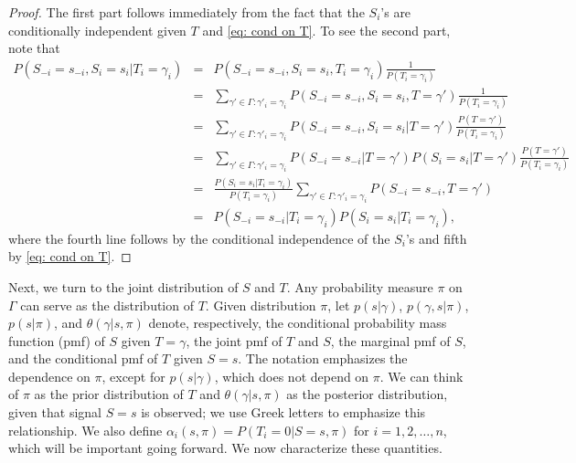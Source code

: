 \documentclass[a4paper,11pt]{article}
\begin{document}
\begin{proof}
The first part follows immediately from the fact that the $S_i$'s are conditionally independent given $T$ and \eqref{eq: cond on T}. To see the second part, note that
\begin{eqnarray*}
P(S_{-i}=s_{-i}, S_i=s_i|T_i=\gamma_i) &=& P(S_{-i}=s_{-i}, S_i=s_i,T_i=\gamma_i) \frac{1}{P(T_i=\gamma_i) }\\
&=& \sum_{\gamma'\in\Gamma:\gamma'_i=\gamma_i} P(S_{-i}=s_{-i}, S_i=s_i, T=\gamma') \frac{1}{P(T_i=\gamma_i) } \\
&=& \sum_{\gamma'\in\Gamma:\gamma'_i=\gamma_i} P(S_{-i}=s_{-i}, S_i=s_i| T=\gamma') \frac{P(T=\gamma')}{P(T_i=\gamma_i)} \\
&=& \sum_{\gamma'\in\Gamma:\gamma'_i=\gamma_i} P(S_{-i}=s_{-i}| T=\gamma') P( S_i=s_i| T=\gamma') \frac{P(T=\gamma')}{P(T_i=\gamma_i)} \\
&=&  \frac{P( S_i=s_i| T_i=\gamma_i)}{P(T_i=\gamma_i)}  \sum_{\gamma'\in\Gamma:\gamma'_i=\gamma_i} P(S_{-i}=s_{-i}, T=\gamma') \\
&=& P(S_{-i}=s_{-i}|T_i=\gamma_i) P(S_i=s_i|T_i=\gamma_i),
\end{eqnarray*}
where the fourth line follows by the conditional independence of the $S_i$'s and fifth by \eqref{eq: cond on T}.
\end{proof}

Next, we turn to the joint distribution of $S$ and $T$. Any probability measure $\pi$ on $\Gamma$ can serve as the distribution of $T$. Given distribution $\pi$, let $p(s|\gamma)$, $p(\gamma ,s|\pi)$, $p(s|\pi)$, and $\theta(\gamma |s,\pi)$ denote, respectively, the conditional  probability mass function (pmf) of $S$ given $T=\gamma$, the joint pmf of $T$ and $S$, the marginal pmf of $S$, and the conditional pmf of $T$ given $S=s$. The notation emphasizes the dependence on $\pi$, except for $p(s|\gamma)$, which does not depend on $\pi$. We can think of $\pi$ as the prior distribution of $T$ and $\theta(\gamma |s,\pi)$ as the posterior distribution, given that signal $S=s$ is observed; we use Greek letters to emphasize this relationship. We also define $\alpha_i(s,\pi)= P(T_i=0 |S=s,\pi)$ for $i=1,2,\dots,n$, which will be important going forward. We now characterize these quantities.
\end{document}
